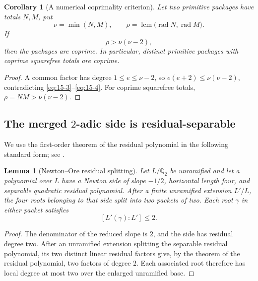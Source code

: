 \documentclass[11pt]{article}
\numberwithin{equation}{section}
\newtheorem{lemma}[theorem]{Lemma}
\newtheorem{corollary}[theorem]{Corollary}
\theoremstyle{definition}
\newcommand{\Q}{\mathbb Q}
\begin{document}
\begin{corollary}[A numerical coprimality criterion]
\label{cor:radicalcriterion}
Let two primitive packages have totals \(N,M\), put
\[
 \nu=\min(N,M),\qquad
 \rho=\operatorname{lcm}\bigl(\operatorname{rad}N,
                                \operatorname{rad}M\bigr).
\]
If
\begin{equation}
 \rho>\nu(\nu-2),
 \label{eq:15-4}
\end{equation}
then the packages are coprime.  In particular, distinct primitive packages
with coprime squarefree totals are coprime.
\end{corollary}

\begin{proof}
A common factor has degree \(1\leq e\leq\nu-2\), so
\(e(e+2)\leq\nu(\nu-2)\), contradicting \eqref{eq:15-3}--\eqref{eq:15-4}.
For coprime squarefree totals, \(\rho=NM>\nu(\nu-2)\).
\end{proof}

\subsection{The merged \texorpdfstring{\(2\)}{2}-adic side is residual-separable}

We use the first-order theorem of the residual polynomial in the following
standard form; see \cite[Theorem~1.21]{GuardiaMontesNart2008}.

\begin{lemma}[Newton--Ore residual splitting]
\label{lem:oreresidual}
Let \(L/\Q_2\) be unramified and let a polynomial over \(L\) have a
Newton side of slope \(-1/2\), horizontal length four, and separable
quadratic residual polynomial.  After a finite unramified extension
\(L'/L\), the four roots belonging to that side split into two packets of
two.  Each root \(\gamma\) in either packet satisfies
\[
 [L'(\gamma):L']\leq2.
\]
\end{lemma}

\begin{proof}
The denominator of the reduced slope is \(2\), and the side has residual
degree two.  After an unramified extension splitting the separable residual
polynomial, its two distinct linear residual factors give, by the theorem of
the residual polynomial, two factors of degree \(2\).  Each associated root
therefore has local degree at most two over the enlarged unramified base.
\end{proof}
\end{document}
